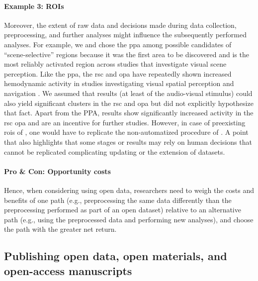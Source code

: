 \paragraph{Example 3: ROIs}
%
Moreover, the extent of raw data and decisions made during data collection,
preprocessing, and further analyses might influence the subsequently performed
analyses.
%
For example, we and \citet{sengupta2016extension} chose the \ac{ppa} among
possible candidates of ``scene-selective'' regions because it was the first area
to be discovered and is the most reliably activated region across
studies that investigate visual scene perception.
%
Like the \ac{ppa}, the \ac{rsc} and \ac{opa} have repeatedly shown
increased hemodynamic activity in studies investigating visual spatial
perception and navigation \citep{chrastil2018heterogeneity, bettencourt2013role,
dilks2013occipital, epstein2019scene}.
%
We assumed that results (at least of the audio-visual stimulus) could also
yield significant clusters in the \ac{rsc} and \ac{opa} but did not explicitly
hypothesize that fact.
%
Apart from the PPA, results show significantly increased activity in the
\ac{rsc} \ac{opa} and are an incentive for further studies.
However, in case of preexisting \acp{roi} of \citep{sengupta2016extension}, one
would have to replicate the non-automatized procedure of
\citep{sengupta2016extension}.
%
A point that also highlights that some stages or results may rely on human
decisions that cannot be replicated complicating updating or the extension of
datasets.


\paragraph{Pro \& Con: Opportunity costs}

Hence, when considering using open data, researchers need to weigh the costs and
benefits of one path (e.g., preprocessing the same data differently than the
preprocessing performed as part of an open dataset) relative to an alternative
path (e.g., using the preprocessed data and performing new analyses), and choose
the path with the greater net return.



\subsection{Publishing open data, open materials, and open-access manuscripts}
%

